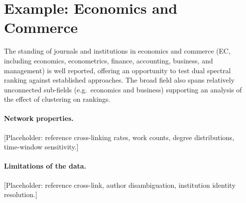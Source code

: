 \section{Example: Economics and Commerce}
\label{sec:corpus}

The standing of journals and institutions in economics and commerce
(EC, including economics, econometrics, finance, accounting, business,
and management) is well reported, offering an opportunity to test dual
spectral ranking against established approaches. The broad field also
spans relatively unconnected sub-fields (e.g.\ economics and business)
supporting an analysis of the effect of clustering on rankings.




\paragraph{Network properties.}
[Placeholder: reference cross-linking rates, work counts, degree
distributions, time-window sensitivity.]

\paragraph{Limitations of the data.}
[Placeholder: reference cross-link, author disambiguation, institution
identity resolution.]
